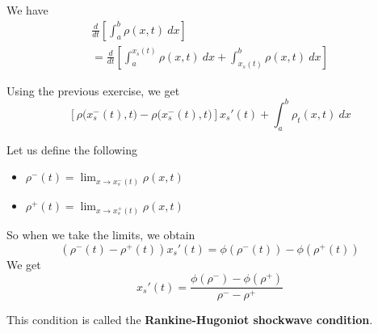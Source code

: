 \begin{solution}

\begin{slide}

\begin{parts}

\item We have
\begin{multline*}	
	\frac{d}{dt} \left[ \int_a^b \rho(x,t) ~dx \right] \\
		= \frac{d}{dt} \left[ \int_a^{x_s(t)} \rho(x,t) ~dx + \int_{x_s(t)}^b \rho(x,t) ~dx \right]
\end{multline*}

Using the previous exercise, we get
\[
\left[\rho\big(x_s^-(t),t\big)- \rho\big(x_s^-(t),t\big) \right] x_s'(t) + \int_a^b \rho_t(x,t) ~dx
\]

	\item Let us define the following
	\begin{itemize}
		\item $\displaystyle\rho^-(t) = \lim_{x \to x_s^-(t)} \rho(x,t)$
		\item $\displaystyle\rho^+(t) = \lim_{x \to x_s^+(t)} \rho(x,t)$
	\end{itemize}
	
	So when we take the limits, we obtain
	\[
		( \rho^-(t) - \rho^+(t)) x_s'(t) = \phi(\rho^-(t)) - \phi(\rho^+(t)) 
	\]
	We get
	\[
		x_s'(t) = \frac{\phi(\rho^-) - \phi(\rho^+)}{\rho^- - \rho^+}
	\]

	This condition is called the \textbf{Rankine-Hugoniot shockwave condition}.
\end{parts}

\end{slide}
\end{solution}




